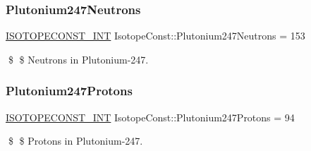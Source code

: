 \subsubsection{\texorpdfstring{Plutonium247\+Neutrons}{Plutonium247Neutrons}}
{\footnotesize\ttfamily \mbox{\hyperlink{group___isotope_const-_macros_ga5f18360b3e99483a35c32d789e62621c}{I\+S\+O\+T\+O\+P\+E\+C\+O\+N\+S\+T\+\_\+\+I\+NT}} Isotope\+Const\+::\+Plutonium247\+Neutrons = 153}

\$ \$ Neutrons in Plutonium-\/247. \mbox{\label{group___isotope_const-_plutonium-_pu247_ga8e889d2509fe93525cb7c16c16767f19}} 
\subsubsection{\texorpdfstring{Plutonium247\+Protons}{Plutonium247Protons}}
{\footnotesize\ttfamily \mbox{\hyperlink{group___isotope_const-_macros_ga5f18360b3e99483a35c32d789e62621c}{I\+S\+O\+T\+O\+P\+E\+C\+O\+N\+S\+T\+\_\+\+I\+NT}} Isotope\+Const\+::\+Plutonium247\+Protons = 94}

\$ \$ Protons in Plutonium-\/247. 
